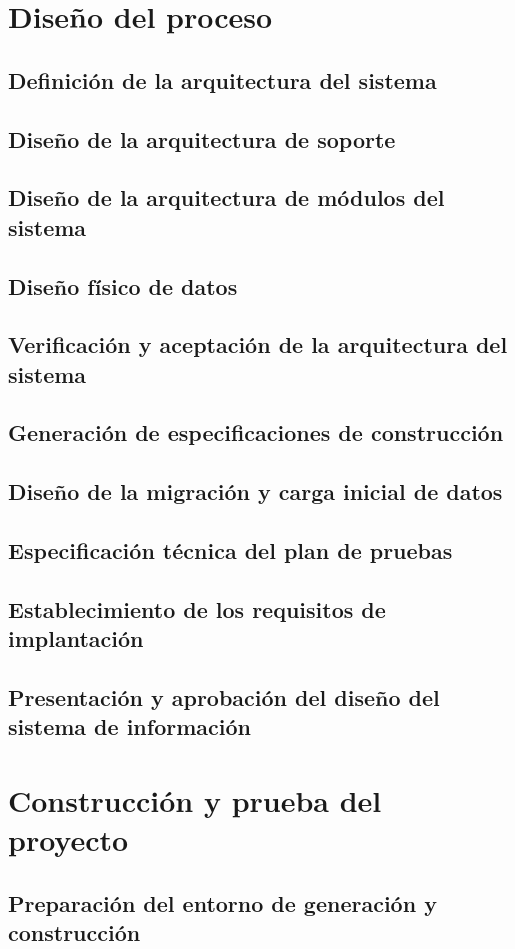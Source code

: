 \documentclass[11pt,a4paper,spanish,twoside]{report}
\begin{document}
\section{Diseño del proceso}
\subsection{Definición de la arquitectura del sistema}
\subsection{Diseño de la arquitectura de soporte}
\subsection{Diseño de la arquitectura de módulos del sistema}
\subsection{Diseño físico de datos}
\subsection{Verificación y aceptación de la arquitectura del sistema}
\subsection{Generación de especificaciones de construcción}
\subsection{Diseño de la migración y carga inicial de datos}
\subsection{Especificación técnica del plan de pruebas}
\subsection{Establecimiento de los requisitos de implantación}
\subsection{Presentación y aprobación del diseño del sistema de información}
\section{Construcción y prueba del proyecto}
\subsection{Preparación del entorno de generación y construcción}
\end{document}

